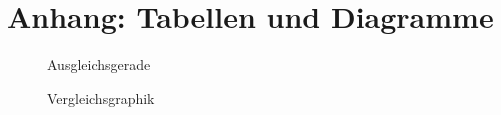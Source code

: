 \documentclass[11pt,a4paper]{article}
\begin{document}







\pagebreak

\section{Anhang: Tabellen und Diagramme}

\begin{figure}[h]
\centering
{}
\renewcommand\thefigure{1}
\caption[Graphik Messpunkte mit Ausgleichsgerade]{Ausgleichsgerade}
\label{Abb:1}
\end{figure}

\begin{figure}[h]
\centering
{}
\renewcommand\thefigure{2}
\caption[Vergleichsgraphik]{Vergleichsgraphik}
\label{Abb:2}
\end{figure}
\end{document}
